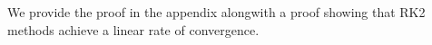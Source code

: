 We provide the proof in the appendix alongwith a proof showing that RK2 methods achieve a linear rate of convergence.

